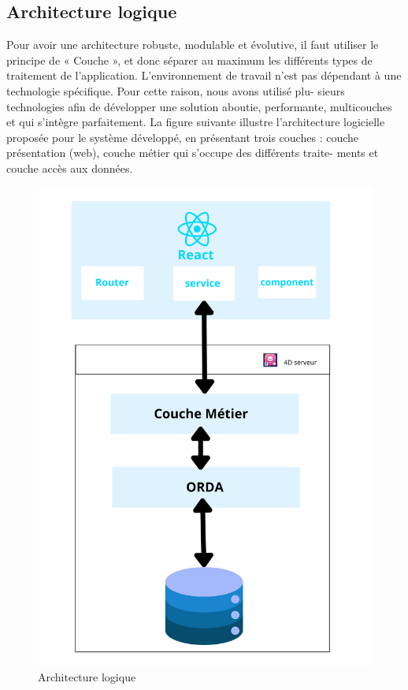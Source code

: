 \subsection{Architecture logique}
Pour avoir une architecture robuste, modulable et évolutive, il faut utiliser le principe de « Couche
», et donc séparer au maximum les différents types de traitement de l’application. L’environnement de travail n’est pas dépendant à une technologie spécifique. Pour cette raison, nous avons utilisé plu- sieurs technologies afin de développer une solution aboutie, performante, multicouches et qui s’intègre parfaitement. La figure suivante illustre l’architecture logicielle proposée pour le système développé, en présentant trois couches : couche présentation (web), couche métier qui s’occupe des différents traite- ments et couche accès aux données.
\begin{figure}[htbp]
   \centering
   \includegraphics[scale=0.1]{Images/logique.png} 
   \caption{Architecture logique}
   \label{fig:logiqueArch}
\end{figure}


